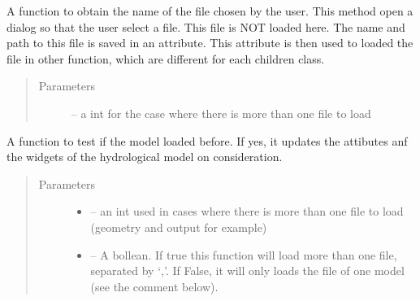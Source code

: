 \documentclass[letterpaper,10pt,english]{sphinxmanual}
\begin{document}
\begin{fulllineitems}

\begin{fulllineitems}
\label{\detokenize{index:src_GUI.hydro_GUI_2.SubHydroW.show_dialog}}
A function to obtain the name of the file chosen by the user. This method open a dialog so that the user select
a file. This file is NOT loaded here. The name and path to this file is saved in an attribute. This attribute
is then used to loaded the file in other function, which are different for each children class.
\begin{quote}\begin{description}
\item[{Parameters}] \leavevmode
{} -- a int for the case where there is more than one file to load

\end{description}\end{quote}

\end{fulllineitems}


\begin{fulllineitems}
\label{\detokenize{index:src_GUI.hydro_GUI_2.SubHydroW.was_model_loaded_before}}
A function to test if the model loaded before. If yes, it updates the attibutes anf the widgets of the
hydrological model on consideration.
\begin{quote}\begin{description}
\item[{Parameters}] \leavevmode\begin{itemize}
\item {} 
 -- an int used in cases where there is more than one file to load (geometry and output for example)

\item {} 
 -- A bollean. If true this function will load more than one file, separated by `,'. If False,
it will only loads the file of one model (see the comment below).

\end{itemize}

\end{description}\end{quote}


\end{fulllineitems}
\end{fulllineitems}
\end{document}
